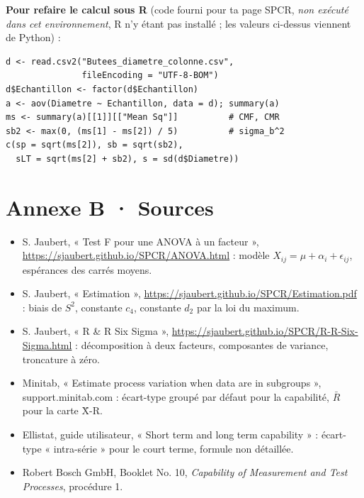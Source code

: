 \documentclass[11pt,a4paper]{article}
\theoremstyle{tq}
\theoremstyle{remark}
\newcommand{\Rb}{\bar{R}}
\begin{document}
\textbf{Pour refaire le calcul sous R} (code fourni pour ta page SPCR, \emph{non exécuté dans cet environnement}, R n'y étant pas installé ; les valeurs ci-dessus viennent de Python) :
\begin{small}
\begin{verbatim}
d <- read.csv2("Butees_diametre_colonne.csv",
               fileEncoding = "UTF-8-BOM")
d$Echantillon <- factor(d$Echantillon)
a <- aov(Diametre ~ Echantillon, data = d); summary(a)
ms <- summary(a)[[1]][["Mean Sq"]]          # CMF, CMR
sb2 <- max(0, (ms[1] - ms[2]) / 5)          # sigma_b^2
c(sp = sqrt(ms[2]), sb = sqrt(sb2),
  sLT = sqrt(ms[2] + sb2), s = sd(d$Diametre))
\end{verbatim}
\end{small}

\section*{Annexe B · Sources}
\begin{itemize}[nosep]
\item S. Jaubert, « Test F pour une ANOVA à un facteur », \url{https://sjaubert.github.io/SPCR/ANOVA.html} : modèle $X_{ij}=\mu+\alpha_i+\epsilon_{ij}$, espérances des carrés moyens.
\item S. Jaubert, « Estimation », \url{https://sjaubert.github.io/SPCR/Estimation.pdf} : biais de $S^2$, constante $c_4$, constante $d_2$ par la loi du maximum.
\item S. Jaubert, « R \& R Six Sigma », \url{https://sjaubert.github.io/SPCR/R-R-Six-Sigma.html} : décomposition à deux facteurs, composantes de variance, troncature à zéro.
\item Minitab, « Estimate process variation when data are in subgroups », support.minitab.com : écart-type groupé par défaut pour la capabilité, $\Rb$ pour la carte X̄-R.
\item Ellistat, guide utilisateur, « Short term and long term capability » : écart-type « intra-série » pour le court terme, formule non détaillée.
\item Robert Bosch GmbH, Booklet No. 10, \emph{Capability of Measurement and Test Processes}, procédure 1.
\end{itemize}
\end{document}

